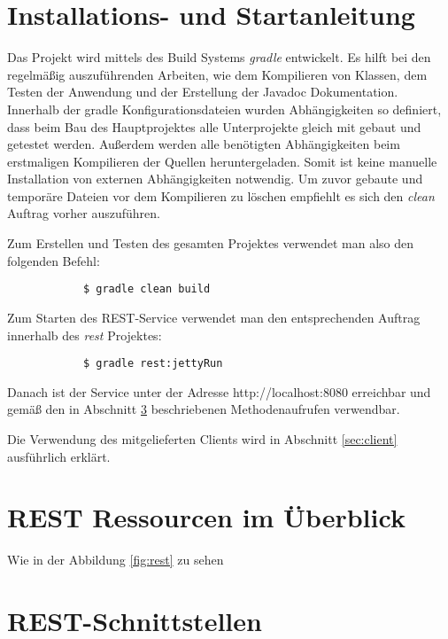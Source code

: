 \documentclass[12pt]{scrartcl}
\begin{document}
	\section{Installations- und Startanleitung}
		Das Projekt wird mittels des Build Systems \emph{gradle} entwickelt. Es hilft bei den regelmäßig auszuführenden Arbeiten, wie dem Kompilieren von Klassen, dem Testen der Anwendung und der Erstellung der Javadoc Dokumentation. Innerhalb der gradle Konfigurationsdateien wurden Abhängigkeiten so definiert, dass beim Bau des Hauptprojektes alle Unterprojekte gleich mit gebaut und getestet werden. Außerdem werden alle benötigten Abhängigkeiten beim erstmaligen Kompilieren der Quellen heruntergeladen. Somit ist keine manuelle Installation von externen Abhängigkeiten notwendig. Um zuvor gebaute und temporäre Dateien vor dem Kompilieren zu löschen empfiehlt es sich den \emph{clean} Auftrag vorher auszuführen.
				
		Zum Erstellen und Testen des gesamten Projektes verwendet man also den folgenden Befehl:
		\begin{verbatim}
			$ gradle clean build
		\end{verbatim}
		
		Zum Starten des REST-Service verwendet man den entsprechenden Auftrag innerhalb des \emph{rest} Projektes:
		\begin{verbatim}
			$ gradle rest:jettyRun
		\end{verbatim}
		
		Danach ist der Service unter der Adresse http://localhost:8080 erreichbar und gemäß den in Abschnitt \ref{sec:restschnittstellen} beschriebenen Methodenaufrufen verwendbar.
		
		Die Verwendung des mitgelieferten Clients wird in Abschnitt \ref{sec:client} ausführlich erklärt.
	\section{REST Ressourcen im Überblick}
		Wie in der Abbildung \ref{fig:rest} zu sehen


	\section{REST-Schnittstellen} \label{sec:restschnittstellen}
\end{document}

